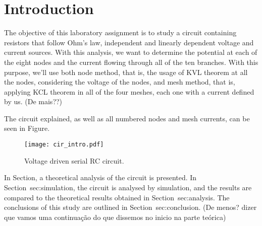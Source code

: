 \section{Introduction}
\label{sec:introduction}

The objective of this laboratory assignment is to study a circuit containing resistors that follow Ohm's law, independent and linearly dependent voltage and current sources. With this analysis, we want to determine the potential at each of the eight nodes and the current flowing through all of the ten branches.
With this purpose, we'll use both node method, that is, the usage of KVL theorem at all the nodes, considering the voltage of the nodes, and mesh method, that is, applying KCL theorem in all of the four meshes, each one with a current defined by us. (De mais??)
\par
The circuit explained, as well as all numbered nodes and mesh currents, can be seen in Figure.

\begin{figure}[H] \centering
\texttt{[image: cir\_intro.pdf]}
\caption{Voltage driven serial RC circuit.}
\label{fig:rc}
\end{figure}


In Section, a theoretical analysis of the circuit is
presented. In Section~{sec:simulation}, the circuit is analysed by
simulation, and the results are compared to the theoretical results obtained in
Section~{sec:analysis}. The conclusions of this study are outlined in
Section~{sec:conclusion}. (De menos? dizer que vamos uma continuação do que dissemos no inicio na parte teórica)
